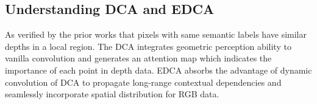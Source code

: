 \documentclass[10pt,twocolumn,letterpaper]{article}
\begin{document}
\subsection{Understanding DCA and EDCA}
As verified by the prior works that pixels with same semantic labels have similar depths \cite{lin2017cascaded, mei2021depth,
   wang2018depth} in a local region. The DCA integrates geometric perception ability to vanilla convolution and generates an attention map
which indicates the importance of each point in depth data. EDCA absorbs the advantage of dynamic convolution of DCA to propagate
long-range contextual dependencies and seamlessly incorporate spatial distribution for RGB data.


\begin{table}[]
   \centering
   \caption{Desirable characteristics of convolution, self-attention, DCA, and EDCA. Notably, DCA and EDCA are applied for depth and RGB data, respectively.}
   \label{prop}
\end{table}
\end{document}
